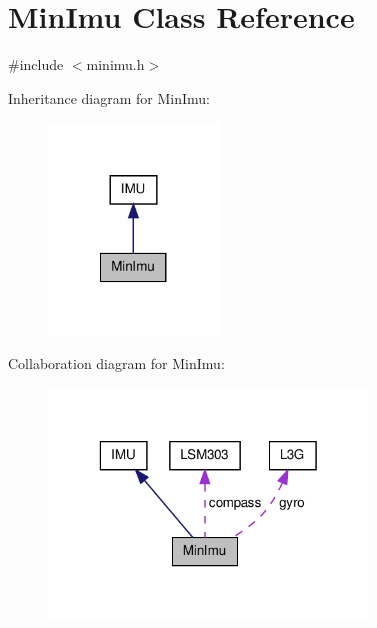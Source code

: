 \hypertarget{class_min_imu}{\section{\-Min\-Imu \-Class \-Reference}
\label{class_min_imu}
}


{\ttfamily \#include $<$minimu.\-h$>$}



\-Inheritance diagram for \-Min\-Imu\-:\nopagebreak
\begin{figure}[H]
\begin{center}
\leavevmode
\includegraphics[width=128pt]{class_min_imu__inherit__graph}
\end{center}
\end{figure}


\-Collaboration diagram for \-Min\-Imu\-:\nopagebreak
\begin{figure}[H]
\begin{center}
\leavevmode
\includegraphics[width=241pt]{class_min_imu__coll__graph}
\end{center}
\end{figure}
